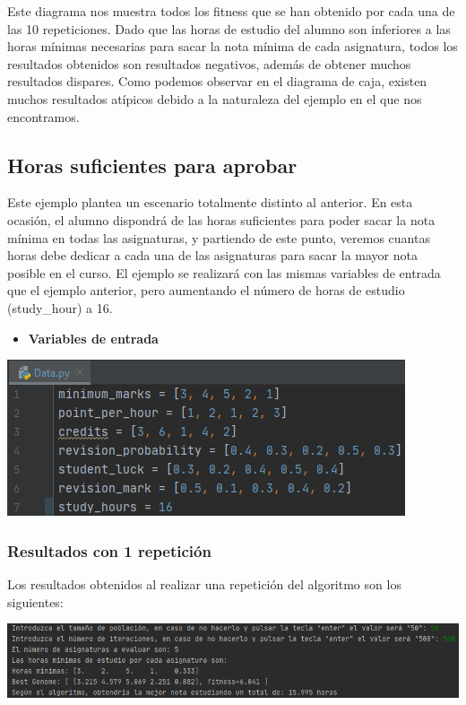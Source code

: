 \documentclass[11pt, a4paper, titlepage]{article}
\begin{document}
Este diagrama nos muestra todos los fitness que se han obtenido por cada una de las 10 repeticiones. Dado que las horas de estudio del alumno son inferiores a las horas mínimas necesarias para sacar la nota mínima de cada asignatura, todos los resultados obtenidos son resultados negativos, además de obtener muchos resultados dispares. Como podemos observar en el diagrama de caja, existen muchos resultados atípicos debido a la naturaleza del ejemplo en el que nos encontramos.

\subsection{Horas suficientes para aprobar}
Este ejemplo plantea un escenario totalmente distinto al anterior. En esta ocasión, el alumno dispondrá de las horas suficientes para poder sacar la nota mínima en todas las asignaturas, y partiendo de este punto, veremos cuantas horas debe dedicar a cada una de las asignaturas para sacar la mayor nota posible en el curso. El ejemplo se realizará con las mismas variables de entrada que el ejemplo anterior, pero aumentando el número de horas de estudio (study\_hour) a 16.

\vspace{5mm}

\begin{itemize}
\item \textbf{Variables de entrada}
\end{itemize}
\includegraphics[scale=1]{img/Data_horas_sufi.png}

\subsubsection{Resultados con 1 repetición}
Los resultados obtenidos al realizar una repetición del algoritmo son los siguientes:

\vspace{5mm}

\includegraphics[scale=0.7]{img/Res1_horas_sufi.png}
\end{document}
